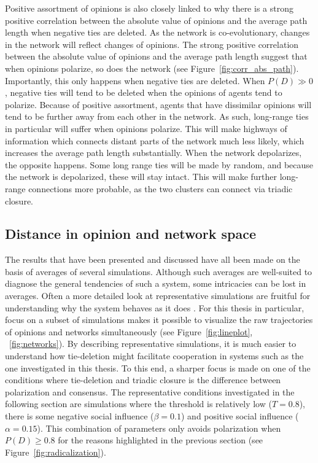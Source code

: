 \documentclass[11pt]{article}
\begin{document}
\noindent Positive assortment of opinions is also closely linked to why there is a strong positive correlation between the absolute value of opinions and the average path length when negative ties are deleted. As the network is co-evolutionary, changes in the network will reflect changes of opinions. The strong positive correlation between the absolute value of opinions and the average path length suggest that when opinions polarize, so does the network (see Figure~\ref{fig:corr_abs_path}).
Importantly, this only happens when negative ties are deleted. When $P(D) \gg 0$, negative ties will tend to be deleted when the opinions of agents tend to polarize. Because of positive assortment, agents that have dissimilar opinions will tend to be further away from each other in the network. As such, long-range ties in particular will suffer when opinions polarize. This will make highways of information which connects distant parts of the network much less likely, which increases the average path length substantially. When the network depolarizes, the opposite happens. Some long range ties will be made by random, and because the network is depolarized, these will stay intact. This will make further long-range connections more probable, as the two clusters can connect via triadic closure.

\subsection{Distance in opinion and network space}

The results that have been presented and discussed have all been made on the basis of averages of several simulations. Although such averages are well-suited to diagnose the general tendencies of such a system, some intricacies can be lost in averages. Often a more detailed look at representative simulations are fruitful for understanding why the system behaves as it does \cite{turner_paths_2018}. For this thesis in particular, focus on a subset of simulations makes it possible to visualize the raw trajectories of opinions and networks simultaneously (see Figure~\ref{fig:lineplot}, ~\ref{fig:networks}). By describing representative simulations, it is much easier to understand how tie-deletion might facilitate cooperation in systems such as the one investigated in this thesis. To this end, a sharper focus is made on one of the conditions where tie-deletion and triadic closure is the difference between polarization and consensus. The representative conditions investigated in the following section are simulations where the threshold is relatively low ($T = 0.8$), there is some negative social influence ($\beta = 0.1$) and positive social influence ($\alpha = 0.15$). This combination of parameters only avoids polarization when $P(D) \geq 0.8$ for the reasons highlighted in the previous section (see Figure~\ref{fig:radicalization}). 
\end{document}
